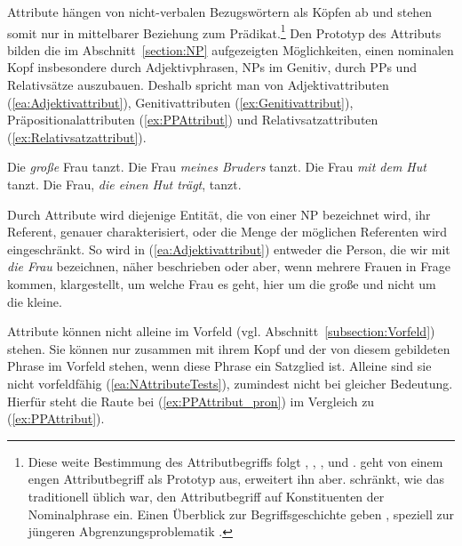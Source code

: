 Attribute hängen von nicht-verbalen Bezugswörtern als Köpfen ab und stehen somit nur in mittelbarer Beziehung zum Prädikat.\footnote{Diese weite Bestimmung des Attributbegriffs folgt \citet[110]{Elst_Habermann_SynAn}, \citet[502]{HelbigBuscha}, \citet[81]{Welke2007}, \citet[152]{OehlSeiler2013} und \citet[698]{Agel2017}. \citet[259]{Eisenberg2020_Satz} geht von einem engen Attributbegriff als Prototyp aus, erweitert ihn aber. \citet[351]{Schaefer2018_3Aufl} schränkt, wie das traditionell üblich war, den Attributbegriff auf Konstituenten der Nominalphrase ein. Einen Überblick zur Begriffsgeschichte geben \citet[307--309]{FuhrhopThierrof2005}, speziell zur jüngeren Abgrenzungsproblematik \citet[231--233]{Engel2011Attribut}.} Den Prototyp des Attributs bilden die im Abschnitt~\ref{section:NP} aufgezeigten Möglichkeiten, einen nominalen Kopf insbesondere durch Adjektivphrasen, NPs im Genitiv, durch PPs und Relativsätze auszubauen. Deshalb spricht man von Adjektivattributen (\ref{ea:Adjektivattribut}), Genitivattributen (\ref{ex:Genitivattribut}), Präpositionalattributen (\ref{ex:PPAttribut}) und Relativsatzattributen (\ref{ex:Relativsatzattribut}). 

\ea \label{ea:NAttribute}
\ea \label{ea:Adjektivattribut} Die \textit{große} Frau tanzt.
\ex \label{ex:Genitivattribut} Die Frau \textit{meines Bruders} tanzt.
\ex \label{ex:PPAttribut} Die Frau \textit{mit dem Hut} tanzt.
\ex \label{ex:Relativsatzattribut} Die Frau, \textit{die einen Hut trägt}, tanzt.
\z 
\z 

Durch Attribute wird diejenige Entität, die von einer NP bezeichnet wird, ihr Referent, genauer charakterisiert, oder die Menge der möglichen Referenten wird eingeschränkt. So wird in (\ref{ea:Adjektivattribut}) entweder die Person, die wir mit \textit{die Frau} bezeichnen, näher beschrieben oder aber, wenn mehrere Frauen in Frage kommen, klargestellt, um welche Frau es geht, hier um die große und nicht um die kleine.  

Attribute können nicht alleine im Vorfeld (vgl. Abschnitt~\ref{subsection:Vorfeld}) stehen. Sie können nur zusammen mit ihrem Kopf und der von diesem gebildeten Phrase im Vorfeld stehen, wenn diese Phrase ein Satzglied ist. Alleine sind sie nicht vorfeldfähig (\ref{ea:NAttributeTests}), zumindest nicht bei gleicher Bedeutung. Hierfür steht die Raute bei (\ref{ex:PPAttribut_pron}) im Vergleich zu (\ref{ex:PPAttribut}). 

\ea \label{ea:NAttributeTests}
\label{ea:Adjektivattribut_top}
\label{ex:Genitivattribut_erfragbar}
\label{ex:PPAttribut_pron}
\label{ex:Relsatz_VF}
\z 
\z 

